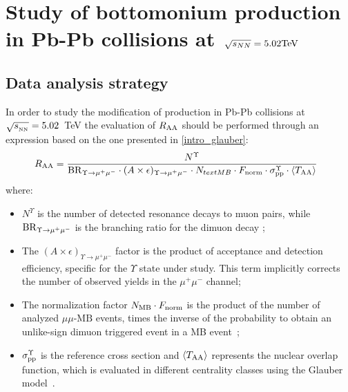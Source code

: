 
\chapter{Study of bottomonium production in Pb-Pb collisions at$\ $ \texorpdfstring{$\sqrt[]{s_{NN}}=5.02 \rm{TeV}$}{sqrt(Snn)=5.02 \rm{TeV}}}

\section{Data analysis strategy}
In order to study the modification of \upsi production in Pb-Pb collisions at $\sqrt{s_{_{\rm NN}}}=5.02$~\rm{TeV} the evaluation of $R_{\rm AA}$ should be performed through an expression based on the one presented in \ref{intro_glauber}:
\begin{equation} \label{eqn:raa}
R_{\rm{AA}} = \frac{N^{\Upsilon}}{ {\rm BR}_{\Upsilon \rightarrow \mu^{+} \mu^{-}} \cdot  (A\times\epsilon)_{\Upsilon \rightarrow \mu^{+} \mu^{-}} \cdot  N_{text{MB}} \cdot F_{\rm norm} \cdot \sigma_{\rm pp}^{\Upsilon} \cdot \langle T_{\rm AA} \rangle } ~~
\end{equation}
where:
\begin{itemize}
\item $N^{\Upsilon}$ is the number of detected resonance decays to muon pairs, while ${\rm BR}_{\Upsilon \rightarrow \mu^{+} \mu^{-}}$ is the branching ratio for the dimuon decay \cite{Agashe:2014kda};
\item The $(A\times\epsilon)_{\Upsilon \rightarrow \mu^{+} \mu^{-}}$ factor is the product of acceptance and detection efficiency, specific for the $\Upsilon$ state under study. This term implicitly corrects the number of observed yields in the $\mu^+\mu^-$ channel;
\item The normalization factor $N_{\text{MB}} \cdot F_{\rm norm}$ is the product of the number of analyzed $\mu\mu\text{-MB}$ events, times the inverse of the probability to obtain an unlike-sign dimuon triggered event in a MB event~\cite{Adam:2016rdg};
\item $\sigma_{\rm pp}^{\Upsilon}$ is the reference \pp cross section and $\langle T_{\rm AA} \rangle$ represents the nuclear overlap function, which is evaluated in different centrality classes using the Glauber model~\cite{Abelev:2013qoq,Adam:2015ptt}.
\end{itemize}

